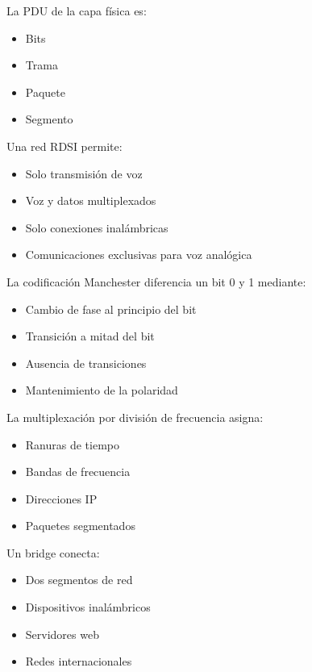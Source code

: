\documentclass[11pt]{article}
\begin{document}
La PDU de la capa física es:

\begin{itemize}
\item Bits

\item Trama

\item Paquete

\item Segmento
\end{itemize}

Una red RDSI permite:

\begin{itemize}
\item Solo transmisión de voz

\item Voz y datos multiplexados

\item Solo conexiones inalámbricas

\item Comunicaciones exclusivas para voz analógica
\end{itemize}

La codificación Manchester diferencia un bit 0 y 1 mediante:

\begin{itemize}
\item Cambio de fase al principio del bit

\item Transición a mitad del bit

\item Ausencia de transiciones

\item Mantenimiento de la polaridad
\end{itemize}

La multiplexación por división de frecuencia asigna:

\begin{itemize}
\item Ranuras de tiempo

\item Bandas de frecuencia

\item Direcciones IP

\item Paquetes segmentados
\end{itemize}

Un bridge conecta:

\begin{itemize}
\item Dos segmentos de red

\item Dispositivos inalámbricos

\item Servidores web

\item Redes internacionales
\end{itemize}
\end{document}
